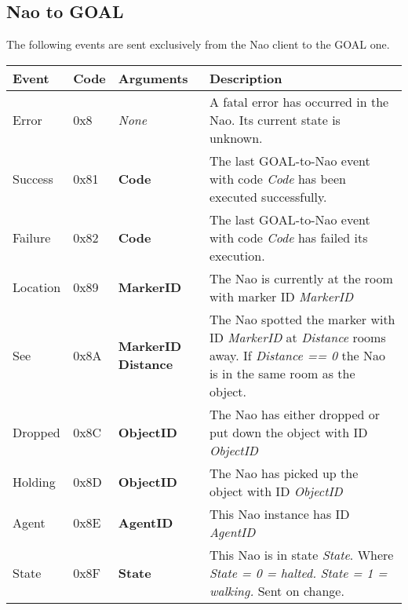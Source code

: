 \documentclass[12pt]{report}
\begin{document}
\subsection{Nao to GOAL}
The following events are sent exclusively from the Nao client to the GOAL one. \\
\begin{tabular}{ | l | l | p{2.2cm} | p{8cm} | }
\hline
\textbf{Event} & \textbf{Code} & \textbf{Arguments} & \textbf{Description} \\ \hline
Error & 0x8 & \textit{None} & A fatal error has occurred in the Nao. Its current state is unknown. \\ \hline
Success & 0x81 & \textbf{Code} & The last GOAL-to-Nao event with code \textit{Code} has been executed successfully. \\ \hline
Failure & 0x82 & \textbf{Code} & The last GOAL-to-Nao event with code \textit{Code} has failed its execution. \\ \hline
Location & 0x89 & \textbf{MarkerID} & The Nao is currently at the room with marker ID \textit{MarkerID} \\ \hline
See & 0x8A & \textbf{MarkerID} \newline \textbf{Distance} & The Nao spotted the marker with ID \textit{MarkerID} at \textit{Distance} rooms away. If \textit{Distance == 0} the Nao is in the same room as the object.  \\ \hline 
Dropped & 0x8C &  \textbf{ObjectID} & The Nao has either dropped or put down the object with ID \textit{ObjectID} \\ \hline
Holding & 0x8D & \textbf{ObjectID} & The Nao has picked up the object with ID \textit{ObjectID} \\ \hline
Agent & 0x8E & \textbf{AgentID} & This Nao instance has ID \textit{AgentID} \\ \hline
State & 0x8F & \textbf{State} & This Nao is in state \textit{State}. Where \newline \textit{State = 0 = halted.} \newline \textit{State = 1 = walking.} \newline Sent on change. \\ \hline
\end{tabular}
\end{document}
